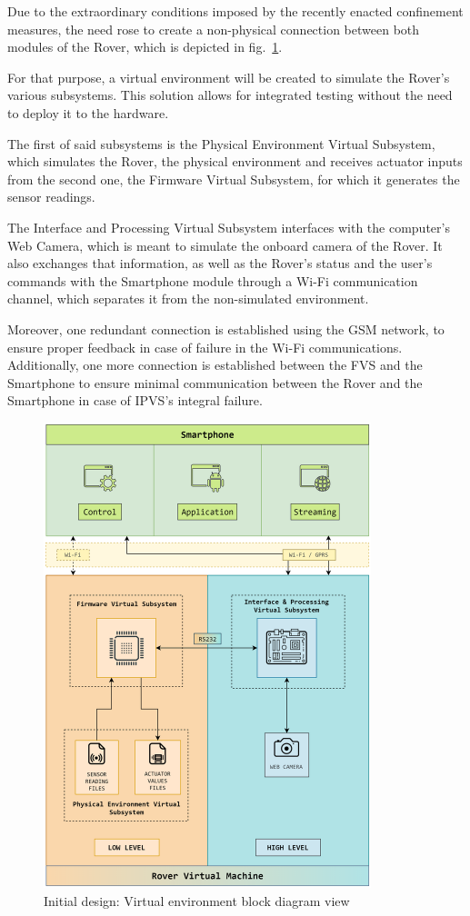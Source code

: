 Due to the extraordinary conditions imposed by the recently enacted confinement measures, the need rose to create a non-physical connection between both modules of the Rover, which is depicted in fig.~\ref{fig:initial-design-2}.
\par
For that purpose, a virtual environment will be created to simulate the Rover's various subsystems. This solution allows for integrated testing without the need to deploy it to the hardware. 
\par
The first of said subsystems is the Physical Environment Virtual Subsystem, which simulates the Rover,  the physical environment and receives actuator inputs from the second one, the Firmware Virtual Subsystem, for which it generates the sensor readings. 
\par
The Interface and Processing Virtual Subsystem interfaces with the computer's Web Camera, which is meant to simulate the onboard camera of the Rover. It also exchanges that information, as well as the Rover's status and the user's commands with the Smartphone module through a Wi-Fi communication channel, which separates it from the non-simulated environment. 
\par
Moreover, one redundant connection is established using the GSM network, to ensure proper feedback in case of failure in the Wi-Fi communications. Additionally, one more connection is established between the FVS and the Smartphone to ensure minimal communication between the Rover and the Smartphone in case of IPVS's integral failure.

\clearpage
\begin{figure}[!ht]
\centering
\includegraphics[width=0.85\textwidth]{./sec/img/initial_design_diagram_2.png}
\caption{\label{fig:initial-design-2}Initial design: Virtual environment block diagram view}
\end{figure}

